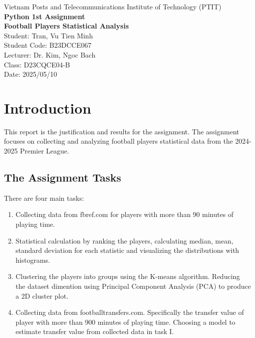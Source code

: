 \documentclass{report}
\begin{document}

\begin{center}
    Vietnam Posts and Telecommunications Institute of Technology (PTIT) \\
    \vspace{0.5cm}
    \Large\textbf{Python 1st Assignment \\ Football Players Statistical Analysis} \\
    \vspace{0.5cm}
    \normalsize 
    Student: Tran, Vu Tien Minh \\
    Student Code: B23DCCE067 \\
    Lecturer: Dr. Kim, Ngoc Bach \\
    Class: D23CQCE04-B \\
    Date: 2025/05/10
\end{center}

\section{Introduction}
This report is the justification and results for the assignment. 
The assignment focuses on collecting and analyzing football players statistical data from 
the 2024-2025 Premier League.

\subsection{The Assignment Tasks}
There are four main tasks:
\begin{enumerate}
    \renewcommand{\labelenumi}{\Roman{enumi}.}
    \item Collecting data from fbref.com for players with more than 90 minutes of 
    playing time.
    \item Statistical calculation by ranking the players, calculating median, mean, standard 
    deviation for each statistic and visualizing the distributions with histograms.
    \item Clustering the players into groups using the K-means algorithm. 
    Reducing the dataset dimention using Principal Component Analysis (PCA) to produce a 2D 
    cluster plot. 
    \item Collecting data from footballtransfers.com. Specifically the transfer value of player 
    with more than 900 minutes of playing time. 
    Choosing a model to estimate transfer value from collected data in task I.
\end{enumerate}
\end{document}
